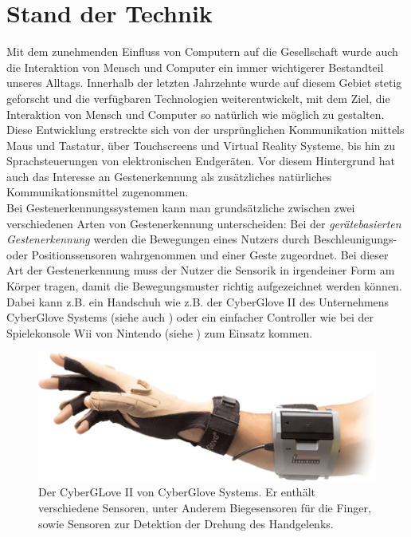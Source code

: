 \chapter{Stand der Technik}
\label{ch:StandDerTechnik}

Mit dem zunehmenden Einfluss von Computern auf die Gesellschaft wurde auch die Interaktion von Mensch und Computer ein immer wichtigerer Bestandteil unseres Alltags. Innerhalb der letzten Jahrzehnte wurde auf diesem Gebiet stetig geforscht und die verfügbaren Technologien weiterentwickelt, mit dem Ziel, die Interaktion von Mensch und Computer so natürlich wie möglich zu gestalten. Diese Entwicklung erstreckte sich von der ursprünglichen Kommunikation mittels Maus und Tastatur, über Touchscreens und Virtual Reality Systeme, bis hin zu Sprachsteuerungen von elektronischen Endgeräten. Vor diesem Hintergrund hat auch das Interesse an Gestenerkennung als zusätzliches natürliches Kommunikationsmittel zugenommen. \\
Bei Gestenerkennungssystemen kann man grundsätzliche zwischen zwei verschiedenen Arten von Gestenerkennung unterscheiden: Bei der \textit{gerätebasierten Gestenerkennung} werden die Bewegungen eines Nutzers durch Beschleunigungs- oder Positionssensoren wahrgenommen und einer Geste zugeordnet. Bei dieser Art der Gestenerkennung muss der Nutzer die Sensorik in irgendeiner Form am Körper tragen, damit die Bewegungsmuster richtig aufgezeichnet werden können. Dabei kann z.B. ein Handschuh wie z.B. der CyberGlove II des Unternehmens CyberGlove Systems (siehe auch ) oder ein einfacher Controller wie bei der Spielekonsole Wii von Nintendo (siehe ) zum Einsatz kommen.
\begin{figure}[h]
	\centering
	\includegraphics[scale=0.4]{../figures/CyberGlove.png}
	\caption{Der CyberGLove II von CyberGlove Systems. Er enthält verschiedene Sensoren, unter Anderem Biegesensoren für die Finger, sowie Sensoren zur Detektion der Drehung des Handgelenks. }
	\label{fig:CyberGlove}
\end{figure}

